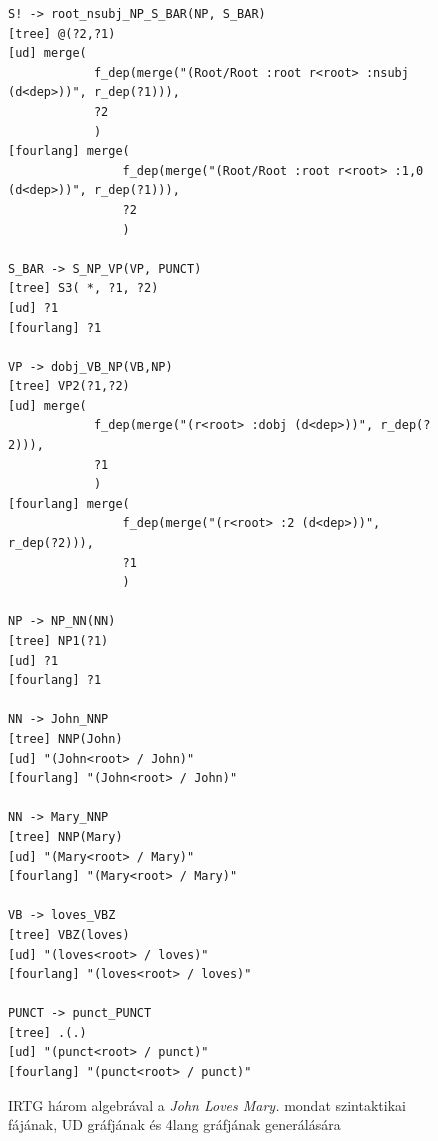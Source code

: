 \begin{figure}[h!]
\footnotesize
\begin{verbatim}
S! -> root_nsubj_NP_S_BAR(NP, S_BAR)
[tree] @(?2,?1)
[ud] merge(
			f_dep(merge("(Root/Root :root r<root> :nsubj (d<dep>))", r_dep(?1))),
			?2
			)
[fourlang] merge(
				f_dep(merge("(Root/Root :root r<root> :1,0 (d<dep>))", r_dep(?1))),
				?2
				)

S_BAR -> S_NP_VP(VP, PUNCT)
[tree] S3( *, ?1, ?2)
[ud] ?1
[fourlang] ?1

VP -> dobj_VB_NP(VB,NP)
[tree] VP2(?1,?2)
[ud] merge(
			f_dep(merge("(r<root> :dobj (d<dep>))", r_dep(?2))),
			?1
			)
[fourlang] merge(
				f_dep(merge("(r<root> :2 (d<dep>))", r_dep(?2))),
				?1
				)

NP -> NP_NN(NN)
[tree] NP1(?1)
[ud] ?1
[fourlang] ?1

NN -> John_NNP
[tree] NNP(John)
[ud] "(John<root> / John)"
[fourlang] "(John<root> / John)"

NN -> Mary_NNP
[tree] NNP(Mary)
[ud] "(Mary<root> / Mary)"
[fourlang] "(Mary<root> / Mary)"

VB -> loves_VBZ
[tree] VBZ(loves)
[ud] "(loves<root> / loves)"
[fourlang] "(loves<root> / loves)"

PUNCT -> punct_PUNCT
[tree] .(.)
[ud] "(punct<root> / punct)"
[fourlang] "(punct<root> / punct)"
\end{verbatim}
\caption{IRTG három algebrával a \textit{John Loves Mary.} mondat szintaktikai fájának, UD gráfjának és 4lang gráfjának generálására}
\label{cod:example6}
\end{figure}

